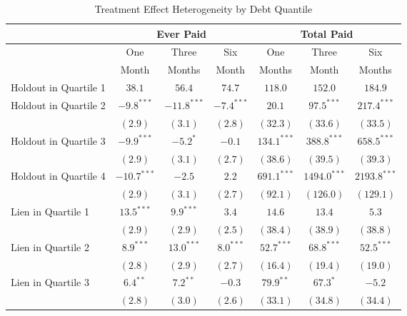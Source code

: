 \documentclass[12pt]{article}
\begin{document}
\begin{table}[htbp]
\caption{Treatment Effect Heterogeneity by Debt Quantile}
\begin{center}
\begin{tabular}{l c c c c c c }
\hline
 & \multicolumn{3}{c}{Ever Paid} & \multicolumn{3}{c}{Total Paid} \\
   \hline
   & One  & Three  & Six & One & Three  & Six \\
 & Month & Months & Month & Months & Month & Months \\
 \hline
 Holdout in Quartile 1 & $38.1$  & $56.4$  & $74.7$ & $118.0$ & $152.0$  & $184.9$  \\
\hline
Holdout in Quartile 2 & $-9.8^{***}$  & $-11.8^{***}$ & $-7.4^{***}$ & $20.1$        & $97.5^{***}$   & $217.4^{***}$  \\
                      & $(2.9)$       & $(3.1)$       & $(2.8)$      & $(32.3)$      & $(33.6)$       & $(33.5)$       \\
Holdout in Quartile 3 & $-9.9^{***}$  & $-5.2^{*}$    & $-0.1$       & $134.1^{***}$ & $388.8^{***}$  & $658.5^{***}$  \\
                      & $(2.9)$       & $(3.1)$       & $(2.7)$      & $(38.6)$      & $(39.5)$       & $(39.3)$       \\
Holdout in Quartile 4 & $-10.7^{***}$ & $-2.5$        & $2.2$        & $691.1^{***}$ & $1494.0^{***}$ & $2193.8^{***}$ \\
                      & $(2.9)$       & $(3.1)$       & $(2.7)$      & $(92.1)$      & $(126.0)$      & $(129.1)$      \\
Lien in Quartile 1    & $13.5^{***}$  & $9.9^{***}$   & $3.4$        & $14.6$        & $13.4$         & $5.3$          \\
                      & $(2.9)$       & $(2.9)$       & $(2.5)$      & $(38.4)$      & $(38.9)$       & $(38.8)$       \\
Lien in Quartile 2    & $8.9^{***}$   & $13.0^{***}$  & $8.0^{***}$  & $52.7^{***}$  & $68.8^{***}$   & $52.5^{***}$   \\
                      & $(2.8)$       & $(2.9)$       & $(2.7)$      & $(16.4)$      & $(19.4)$       & $(19.0)$       \\
Lien in Quartile 3    & $6.4^{**}$    & $7.2^{**}$    & $-0.3$       & $79.9^{**}$   & $67.3^{*}$     & $-5.2$         \\
                      & $(2.8)$       & $(3.0)$       & $(2.6)$      & $(33.1)$      & $(34.8)$       & $(34.4)$       \\

\end{tabular}
\end{center}
\end{table}
\end{document}
